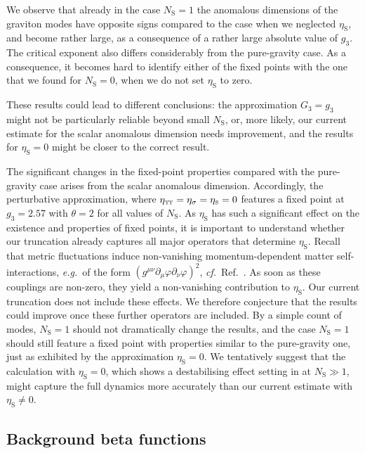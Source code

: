 \documentclass[11pt]{book}
\newcommand\TTspace{ -1pt }
\newcommand\etaTT{ \eta_{\scriptscriptstyle{\mathrm{T\hspace{\TTspace}T}}} }
\newcommand\etaS{ \eta_{\scriptscriptstyle{\mathrm{S}}} }
\newcommand\NS{ N_{\scriptscriptstyle{\mathrm{S}}} }
\newcommand\eg{\textit{e.g.}\ }
\newcommand\cf{\textit{cf.}\ }
\numberwithin{equation}{chapter}
\begin{document}
We observe that already in the case $\NS=1$
the anomalous dimensions of the graviton modes
have opposite signs compared to the case when we neglected $\etaS$,
and become rather large, as a consequence of a rather large absolute value of $g_3$.
The critical exponent also differs considerably from the pure-gravity case.
As a consequence, it becomes hard to identify either of the fixed points
with the one that we found for $\NS=0$, when we do not set $\etaS$ to zero.

These results could lead to different conclusions:
the approximation $G_3 = g_3$ might not be particularly reliable
beyond small $\NS$, or, more likely, our current estimate
for the scalar anomalous dimension needs improvement,
and the results for $\etaS=0$ might be closer to the correct result.

The significant changes in the fixed-point properties compared with the pure-gravity
case arises from the scalar anomalous dimension.
Accordingly, the perturbative approximation, where $\etaTT=\eta_{\sigma}=\etaS=0$
features a fixed point at $g_3=2.57$ with $\theta=2$ for all values of $\NS$.
As $\etaS$ has such a significant effect on the existence and properties of fixed points,
it is important to understand whether our truncation already captures all major operators
that determine $\etaS$.
Recall that metric fluctuations induce non-vanishing momentum-dependent
matter self-interactions, \eg of the form
$\left(g^{\mu \nu} \partial_{\mu} \varphi \partial_{\nu}\varphi\right)^2$,
\cf Ref.~\cite{Eichhorn:2012va}. As soon as these couplings
are non-zero, they yield a non-vanishing contribution to $\etaS$.
Our current truncation does not include these effects.
We therefore conjecture that the results could improve once these further operators are included.
By a simple count of modes, $\NS=1$ should not dramatically change the results, and the case $\NS=1$
should still feature a fixed point with properties similar to the pure-gravity one,
just as exhibited by the approximation $\etaS=0$.
We tentatively suggest that the calculation with $\etaS=0$,
which shows a destabilising effect setting in at $\NS\gg1$,
might capture the full dynamics more accurately than our current estimate with $\etaS \neq 0$.


\subsection{Background beta functions}
\end{document}
